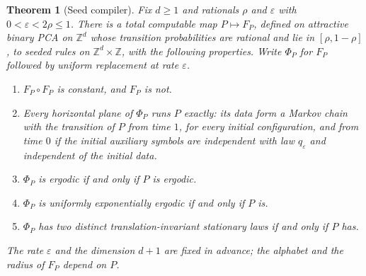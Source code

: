 \documentclass[11pt]{article}
\theoremstyle{plain}
\newtheorem{theorem}{Theorem}[section]
\theoremstyle{definition}
\theoremstyle{remark}
\newcommand{\Z}{\mathbb Z}
\newcommand{\eps}{\varepsilon}
\begin{document}
\begin{theorem}[Seed compiler]\label{thm:compiler}
Fix $d\geq1$ and rationals $\rho$ and $\eps$ with $0<\eps<2\rho\leq1$. There is a total computable map $P\mapsto F_P$, defined on attractive binary PCA on $\Z^d$ whose transition probabilities are rational and lie in $[\rho,1-\rho]$, to seeded rules on $\Z^d\times\Z$, with the following properties. Write $\Phi_P$ for $F_P$ followed by uniform replacement at rate $\eps$.
\begin{enumerate}[label=\textup{(\roman*)}]
\item $F_P\circ F_P$ is constant, and $F_P$ is not.
\item Every horizontal plane of $\Phi_P$ runs $P$ exactly: its data form a Markov chain with the transition of $P$ from time $1$, for every initial configuration, and from time $0$ if the initial auxiliary symbols are independent with law $q_\eps$ and independent of the initial data.
\item $\Phi_P$ is ergodic if and only if $P$ is ergodic.
\item $\Phi_P$ is uniformly exponentially ergodic if and only if $P$ is.
\item $\Phi_P$ has two distinct translation-invariant stationary laws if and only if $P$ has.
\end{enumerate}
The rate $\eps$ and the dimension $d+1$ are fixed in advance; the alphabet and the radius of $F_P$ depend on $P$.
\end{theorem}
\end{document}
